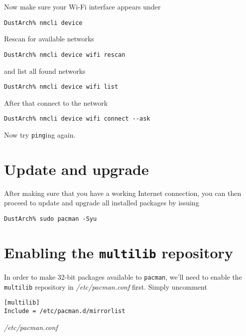 \documentclass[10pt]{dustdoc}
\begin{document}
Now make sure your Wi-Fi interface appears under

\begin{verbatim}
DustArch% nmcli device
\end{verbatim}

Rescan for available networks

\begin{verbatim}
DustArch% nmcli device wifi rescan
\end{verbatim}

\noindent
and list all found networks

\begin{verbatim}
DustArch% nmcli device wifi list
\end{verbatim}

After that connect to the network

\begin{verbatim}
DustArch% nmcli device wifi connect --ask
\end{verbatim}

Now try \texttt{ping}ing again.

\section{Update and upgrade}
\label{sec:update-and-upgrade}

After making sure that you have a working Internet connection, you can then proceed to update and upgrade all installed packages by issuing

\begin{verbatim}
DustArch% sudo pacman -Syu
\end{verbatim}

\section{Enabling the \texttt{multilib} repository}
\label{sec:enabling-the-multilib-repository}

In order to make 32-bit packages available to \texttt{pacman}, we’ll need to enable the \texttt{multilib} repository in \textit{/etc/pacman.conf} first.
Simply uncomment

\begin{mintedlisting}
    \begin{verbatim}
[multilib]
Include = /etc/pacman.d/mirrorlist
    \end{verbatim}

    \caption{\textit{/etc/pacman.conf}}
\end{mintedlisting}
\end{document}
